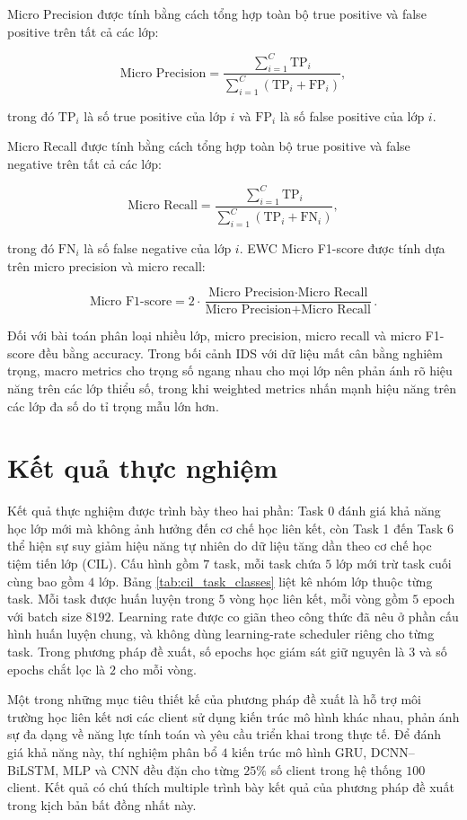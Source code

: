 Micro Precision được tính bằng cách tổng hợp toàn bộ true positive và false positive trên tất cả các lớp:

\[
\text{Micro Precision} = \frac{\sum_{i=1}^{C} \text{TP}_i}{\sum_{i=1}^{C} (\text{TP}_i + \text{FP}_i)},
\]

trong đó $\text{TP}_i$ là số true positive của lớp $i$ và $\text{FP}_i$ là số false positive của lớp $i$.

Micro Recall được tính bằng cách tổng hợp toàn bộ true positive và false negative trên tất cả các lớp:

\[
\text{Micro Recall} = \frac{\sum_{i=1}^{C} \text{TP}_i}{\sum_{i=1}^{C} (\text{TP}_i + \text{FN}_i)},
\]

trong đó $\text{FN}_i$ là số false negative của lớp $i$.
EWC
Micro F1-score được tính dựa trên micro precision và micro recall:

\[
\text{Micro F1-score} = 2 \cdot \frac{\text{Micro Precision} \cdot \text{Micro Recall}}{\text{Micro Precision} + \text{Micro Recall}}.
\]

Đối với bài toán phân loại nhiều lớp, micro precision, micro recall và micro F1-score đều bằng accuracy. Trong bối cảnh IDS với dữ liệu mất cân bằng nghiêm trọng, macro metrics cho trọng số ngang nhau cho mọi lớp nên phản ánh rõ hiệu năng trên các lớp thiểu số, trong khi weighted metrics nhấn mạnh hiệu năng trên các lớp đa số do tỉ trọng mẫu lớn hơn.

\section{Kết quả thực nghiệm}

Kết quả thực nghiệm được trình bày theo hai phần: Task 0 đánh giá khả năng học lớp mới mà không ảnh hưởng đến cơ chế học liên kết, còn Task 1 đến Task 6 thể hiện sự suy giảm hiệu năng tự nhiên do dữ liệu tăng dần theo cơ chế học tiệm tiến lớp (CIL). Cấu hình gồm $7$ task, mỗi task chứa $5$ lớp mới trừ task cuối cùng bao gồm $4$ lớp. Bảng \ref{tab:cil_task_classes} liệt kê nhóm lớp thuộc từng task. Mỗi task được huấn luyện trong $5$ vòng học liên kết, mỗi vòng gồm $5$ epoch với batch size $8192$. Learning rate được co giãn theo công thức đã nêu ở phần cấu hình huấn luyện chung, và không dùng learning-rate scheduler riêng cho từng task. Trong phương pháp đề xuất, số epochs học giám sát giữ nguyên là $3$ và số epochs chắt lọc là $2$ cho mỗi vòng.

Một trong những mục tiêu thiết kế của phương pháp đề xuất là hỗ trợ môi trường học liên kết nơi các client sử dụng kiến trúc mô hình khác nhau, phản ánh sự đa dạng về năng lực tính toán và yêu cầu triển khai trong thực tế. Để đánh giá khả năng này, thí nghiệm phân bổ $4$ kiến trúc mô hình GRU, DCNN--BiLSTM, MLP và CNN đều đặn cho từng $25\%$ số client trong hệ thống $100$ client. Kết quả có chú thích multiple trình bày kết quả của phương pháp đề xuất trong kịch bản bất đồng nhất này.

